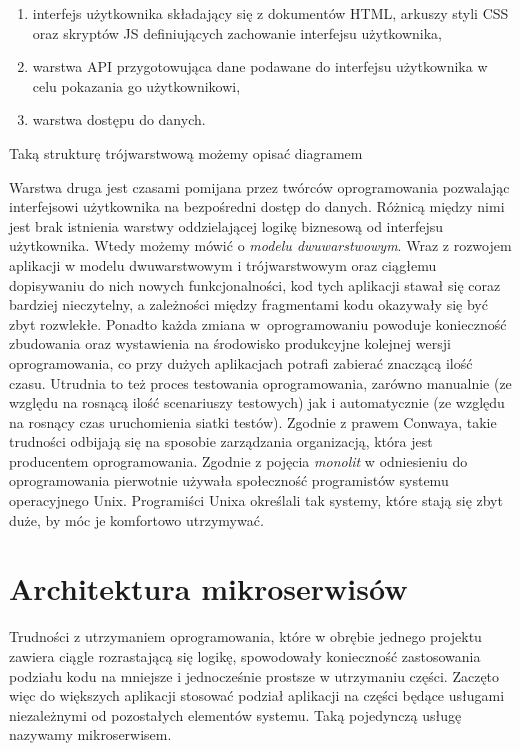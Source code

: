 \documentclass{SGGW-thesis}
\begin{document}
  \begin{enumerate}
    \item interfejs użytkownika składający się z dokumentów HTML, arkuszy styli CSS oraz skryptów JS definiujących zachowanie interfejsu użytkownika,
    \item warstwa API przygotowująca dane podawane do interfejsu użytkownika w celu pokazania go użytkownikowi,
    \item warstwa dostępu do danych.
  \end{enumerate}
  
  Taką strukturę trójwarstwową możemy opisać diagramem


  Warstwa druga jest czasami pomijana przez twórców oprogramowania pozwalając interfejsowi użytkownika na bezpośredni dostęp do danych. Różnicą między nimi jest brak istnienia warstwy oddzielającej logikę biznesową od interfejsu użytkownika. Wtedy możemy mówić o \textit{modelu dwuwarstwowym}.
  Wraz z rozwojem aplikacji w modelu dwuwarstwowym i trójwarstwowym oraz ciągłemu dopisywaniu do nich nowych funkcjonalności, kod tych aplikacji stawał się coraz bardziej nieczytelny, a zależności między fragmentami kodu okazywały się być zbyt rozwlekłe. 
  Ponadto każda zmiana w~oprogramowaniu powoduje konieczność zbudowania oraz wystawienia na środowisko produkcyjne kolejnej wersji oprogramowania, co przy dużych aplikacjach potrafi zabierać znaczącą ilość czasu. Utrudnia to też proces testowania oprogramowania, zarówno manualnie (ze względu na rosnącą ilość scenariuszy testowych) jak i automatycznie (ze względu na rosnący czas uruchomienia siatki testów).
  Zgodnie z prawem Conwaya, takie trudności odbijają się na sposobie zarządzania organizacją, która jest producentem oprogramowania.
  Zgodnie z \cite{fowler} pojęcia \textit{monolit} w odniesieniu do oprogramowania pierwotnie używała społeczność programistów systemu operacyjnego Unix. Programiści Unixa określali tak systemy, które stają się zbyt duże, by móc je komfortowo utrzymywać. 

  \section{Architektura mikroserwisów}

  Trudności z utrzymaniem oprogramowania, które w obrębie jednego projektu zawiera ciągle rozrastającą się logikę, spowodowały konieczność zastosowania podziału kodu na mniejsze i jednocześnie prostsze w utrzymaniu części. 
  Zaczęto więc do większych aplikacji stosować podział aplikacji na części będące usługami niezależnymi od pozostałych elementów systemu. Taką pojedynczą usługę nazywamy mikroserwisem.
\end{document}
